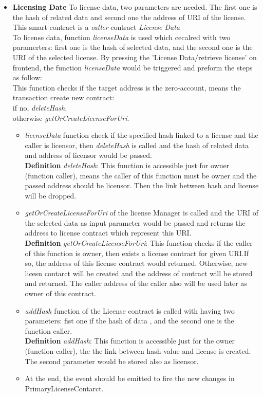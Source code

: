 \begin{itemize}
	\item \textbf{Licensing Date}
	To license data, two parameters are needed. The first one is the hash of related data and second one the address of URI of the  license.
	 This smart contract is a \textit{caller} contract
	\textit{License Data} \\
	To license data, function \textit{licenseData} is used which cecalred with two paramerters: first one is the hash of selected data, and the second one is the URI of the selected license. By pressing the 'License Data/retrieve license' on frontend, the function
	\textit{licenseData} would be triggered and  preform the steps as follow: \\
	This function checks if the target address is the zero-account, means the transaction create new contract: \\
	
	if no, \textit{deleteHash}, \\
	otherwise \textit{getOrCreateLicenseForUri}. \\
	\begin{itemize}
		\item \textit{licenseData} function check if the specified hash linked to a license and  the caller is  licensor, then \textit{deleteHash} is called and the hash of related data and address of licensor would be passed. \\
		\hspace{1cm} \textbf{Definition} \textit{deleteHash}: This function is accessible just for owner (function caller), means the caller of this function must be owner and the passed address should be licensor. Then the link between hash and license will be dropped.
		\item \textit{getOrCreateLicenseForUri} of the license Manager is called and the URI of the selected data as input parameter would be passed and returns the address to license contract which represent this URI.\\
		\hspace{1cm} \textbf{Definition} \textit{getOrCreateLicenseForUri}: This function checks if the caller of this function is owner, then exists a license contract for given URI.If so, the address of this license contract would returned. Otherwise, new licesn contarct will be created and the address of contract will be stored and returned. The caller address of the caller also will be used later as owner of this contract.
		\item \textit{addHash} function of the License contract is called with having two parameters: fist one if the hash of data , and the second one is the function caller.\\
		\hspace{1cm} \textbf{Definition} \textit{addHash}: This function is accessible just for the owner (function caller), the the link between hash value and license is created. The second parameter would be stored also as licensor. \\
		\item At the end, the event should be emitted to fire the new changes in PrimaryLicenseContarct.
		

\end{itemize}
\end{itemize}
